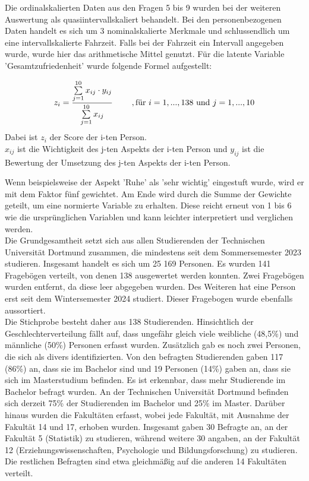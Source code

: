 \documentclass[11pt, a4paper]{article}
\begin{document}
Die ordinalskalierten Daten aus den Fragen 5 bis 9 wurden bei der weiteren Auswertung als quasiintervallskaliert behandelt. Bei den personenbezogenen Daten handelt es sich um 3 nominalskalierte Merkmale und schlussendlich um eine intervallskalierte Fahrzeit. Falls bei der Fahrzeit ein Intervall angegeben wurde, wurde hier das arithmetische Mittel genutzt. 
Für die latente Variable 'Gesamtzufriedenheit' wurde folgende Formel aufgestellt:

\begin{equation*}
	z_i = \frac{\sum\limits_{j=1}^{10}x_{ij}\cdot  y_{ij}}{\sum\limits_{j=1}^{10}x_{ij}} \hspace{0.8cm} , \text{für} \ 
	i=1,...,138\  \text{und} \ j=1,...,10
\end{equation*} 
Dabei ist $z_i$ der Score der i-ten Person. \\
$x_{ij}$ ist die Wichtigkeit des j-ten Aspekts der i-ten Person und
$y_{ij}$ ist die Bewertung der Umsetzung des j-ten Aspekts der i-ten Person.

 Wenn beispielsweise der Aspekt 'Ruhe' als 'sehr wichtig' eingestuft wurde, wird er mit dem Faktor fünf gewichtet. Am Ende wird durch die Summe der Gewichte geteilt, um eine normierte Variable zu erhalten.  Diese reicht erneut von 1 bis 6 wie die ursprünglichen Variablen und kann leichter interpretiert und verglichen werden.\\


Die Grundgesamtheit setzt sich aus allen Studierenden der Technischen Universität Dortmund zusammen, die mindestens seit dem Sommersemester 2023 studieren. Insgesamt handelt es sich um 25 169 Personen. Es wurden 141 Fragebögen verteilt, von denen 138 ausgewertet werden konnten. Zwei Fragebögen wurden entfernt, da diese leer abgegeben wurden. Des Weiteren hat eine Person erst seit dem Wintersemester 2024 studiert. Dieser Fragebogen wurde ebenfalls aussortiert. \\


Die Stichprobe besteht daher aus 138 Studierenden. Hinsichtlich der Geschlechterverteilung fällt auf, dass ungefähr gleich viele weibliche (48,5\%) und männliche (50\%) Personen erfasst wurden. Zusätzlich gab es noch zwei Personen, die sich als divers identifizierten. Von den befragten Studierenden gaben 117 (86\%) an, dass sie im Bachelor sind und 19 Personen (14\%) gaben an, dass sie sich im Masterstudium befinden. Es ist erkennbar, dass mehr Studierende im Bachelor befragt wurden. An der Technischen Universität Dortmund befinden sich derzeit 75\% der Studierenden im Bachelor und 25\% im Master. Darüber hinaus wurden die Fakultäten erfasst, wobei jede Fakultät, mit Ausnahme der Fakultät 14 und 17, erhoben wurden. Insgesamt gaben 30 Befragte an, an der Fakultät 5 (Statistik) zu studieren, während weitere 30 angaben, an der Fakultät 12 (Erziehungswissenschaften, Psychologie und Bildungsforschung) zu studieren. Die restlichen Befragten sind etwa gleichmäßig auf die anderen 14 Fakultäten verteilt.
\end{document}
